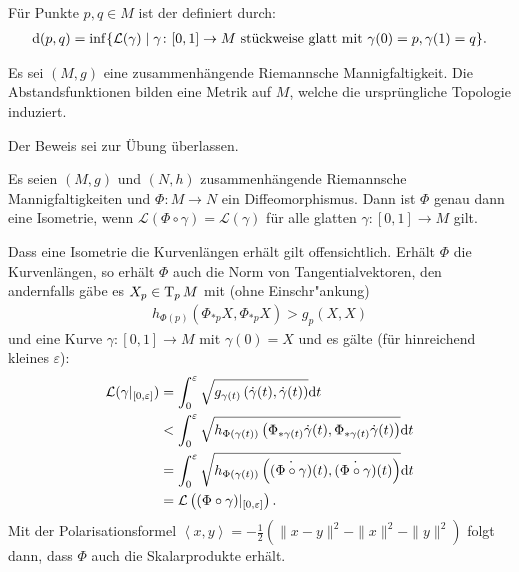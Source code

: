 \begin{Dfn}
  Für Punkte $p, q \in M$ ist der  definiert durch:
  \begin{align*}
    \mathrm{d}(p,q) = \inf\{ \mathcal L(\gamma) \mid \gamma \colon [0,1] \to M \text{ stückweise glatt mit } \gamma(0) = p, \gamma(1) = q\}.
  \end{align*}
\end{Dfn}

\begin{Satz}
  Es sei $(M,g)$ eine zusammenhängende Riemannsche Mannigfaltigkeit.
  Die Abstandsfunktionen bilden eine Metrik auf $M$, welche die ursprüngliche Topologie induziert.
\end{Satz}

Der Beweis sei zur Übung überlassen.

\begin{Satz}
  Es seien $(M,g)$ und $(N,h)$ zusammenhängende Riemannsche Mannigfaltigkeiten und $\Phi \colon M \to N$ ein Diffeomorphismus.
  Dann ist $\Phi$ genau dann eine Isometrie, wenn $\mathcal L(\Phi \circ \gamma) = \mathcal L(\gamma)$ für alle glatten $\gamma \colon [0,1] \to M$ gilt. 
\end{Satz}

\begin{bew}
  Dass eine Isometrie die Kurvenlängen erhält gilt offensichtlich. Erhält $\Phi$ die Kurvenlängen, so erhält $\Phi$ auch die Norm von Tangentialvektoren, den andernfalls gäbe es $X_p \in \operatorname{T}_pM$ mit (ohne Einschr"ankung)
  \begin{align*}
    h_{\Phi(p)}(\Phi_{*p}X,\Phi_{*p}X) > g_p(X,X)
  \end{align*}
  und eine Kurve $\gamma\colon [0,1] \to M$ mit $\gamma(0) = X$ und es gälte (für hinreichend kleines $\varepsilon$):
  \begin{align*}
    \mathcal L(\gamma|_{[0,\varepsilon]}) & = \int_0^{\varepsilon}\sqrt{g_{\gamma(t)}\left(\dot\gamma(t),\dot\gamma(t)\right)}\mathrm{d} t\\
    & < \int_0^{\varepsilon}\sqrt{h_{\Phi(\gamma(t))} \left(\Phi_{*\gamma(t)}\dot\gamma(t), \Phi_{*\gamma(t)}\dot\gamma(t)\right)}\mathrm{d} t\\
    & = \int_0^{\varepsilon}\sqrt{h_{\Phi(\gamma(t))} \left(\dot{(\Phi \circ \gamma)}(t), \dot{(\Phi \circ \gamma)}(t) \right)}\mathrm{d} t\\
    & = \mathcal L \left((\Phi \circ \gamma)|_{[0,\varepsilon]}\right).
  \end{align*}
  Mit der Polarisationsformel $\left<x,y\right> = - \frac{1}2 (\|x-y\|^{2} - \|x\|^2-\|y\|^2)$ folgt dann, dass $\Phi$ auch die Skalarprodukte erhält.
\end{bew}

